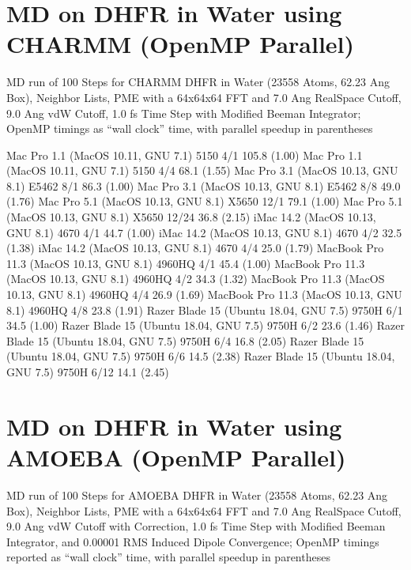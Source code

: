 \documentclass[letterpaper,11pt,english]{sphinxmanual}
\begin{document}
\section{MD on DHFR in Water using CHARMM (OpenMP Parallel)}
\label{\detokenize{text/benchmarks:md-on-dhfr-in-water-using-charmm-openmp-parallel}}
MD run of 100 Steps for CHARMM DHFR in Water (23558 Atoms, 62.23 Ang Box), Neighbor Lists, PME with a 64x64x64 FFT and 7.0 Ang Real\sphinxhyphen{}Space Cutoff, 9.0 Ang vdW Cutoff, 1.0 fs Time Step with Modified Beeman Integrator; OpenMP timings as “wall clock” time, with parallel speedup in parentheses


\begin{sphinxVerbatim}[commandchars=\\\{\}]
Mac Pro 1.1 (MacOS 10.11, GNU 7.1)             5150           4/1       105.8 (1.00)
Mac Pro 1.1 (MacOS 10.11, GNU 7.1)             5150           4/4        68.1 (1.55)
Mac Pro 3.1 (MacOS 10.13, GNU 8.1)            E5462           8/1        86.3 (1.00)
Mac Pro 3.1 (MacOS 10.13, GNU 8.1)            E5462           8/8        49.0 (1.76)
Mac Pro 5.1 (MacOS 10.13, GNU 8.1)            X5650          12/1        79.1 (1.00)
Mac Pro 5.1 (MacOS 10.13, GNU 8.1)            X5650         12/24        36.8 (2.15)
iMac 14.2 (MacOS 10.13, GNU 8.1)               4670           4/1        44.7 (1.00)
iMac 14.2 (MacOS 10.13, GNU 8.1)               4670           4/2        32.5 (1.38)
iMac 14.2 (MacOS 10.13, GNU 8.1)               4670           4/4        25.0 (1.79)
MacBook Pro 11.3 (MacOS 10.13, GNU 8.1)      4960HQ           4/1        45.4 (1.00)
MacBook Pro 11.3 (MacOS 10.13, GNU 8.1)      4960HQ           4/2        34.3 (1.32)
MacBook Pro 11.3 (MacOS 10.13, GNU 8.1)      4960HQ           4/4        26.9 (1.69)
MacBook Pro 11.3 (MacOS 10.13, GNU 8.1)      4960HQ           4/8        23.8 (1.91)
Razer Blade 15 (Ubuntu 18.04, GNU 7.5)        9750H           6/1        34.5 (1.00)
Razer Blade 15 (Ubuntu 18.04, GNU 7.5)        9750H           6/2        23.6 (1.46)
Razer Blade 15 (Ubuntu 18.04, GNU 7.5)        9750H           6/4        16.8 (2.05)
Razer Blade 15 (Ubuntu 18.04, GNU 7.5)        9750H           6/6        14.5 (2.38)
Razer Blade 15 (Ubuntu 18.04, GNU 7.5)        9750H          6/12        14.1 (2.45)
\end{sphinxVerbatim}


\section{MD on DHFR in Water using AMOEBA (OpenMP Parallel)}
\label{\detokenize{text/benchmarks:md-on-dhfr-in-water-using-amoeba-openmp-parallel}}
MD run of 100 Steps for AMOEBA DHFR in Water (23558 Atoms, 62.23 Ang Box), Neighbor Lists, PME with a 64x64x64 FFT and 7.0 Ang Real\sphinxhyphen{}Space Cutoff, 9.0 Ang vdW Cutoff with Correction, 1.0 fs Time Step with Modified Beeman Integrator, and 0.00001 RMS Induced Dipole Convergence; OpenMP timings reported as “wall clock” time, with parallel speedup in parentheses
\end{document}
